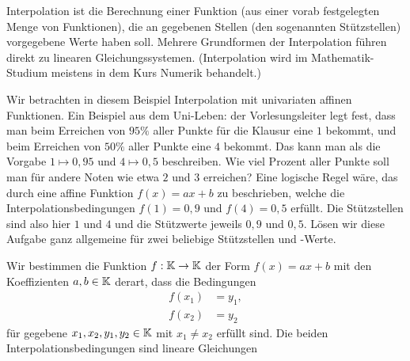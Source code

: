 \begin{bsp}
	Interpolation ist die Berechnung einer Funktion (aus einer vorab festgelegten Menge von Funktionen), die an gegebenen Stellen (den sogenannten Stützstellen) vorgegebene Werte haben soll. Mehrere Grundformen der Interpolation führen direkt zu linearen Gleichungssystemen. (Interpolation wird im Mathematik-Studium meistens in dem Kurs Numerik behandelt.) 
	
	Wir betrachten in diesem Beispiel Interpolation mit univariaten affinen Funktionen. Ein Beispiel aus dem Uni-Leben: der Vorlesungsleiter legt fest, dass man beim Erreichen von $95 \%$ aller Punkte für die Klausur eine $1$ bekommt, und beim Erreichen von $50 \%$ aller Punkte eine $4$ bekommt. Das kann man als die Vorgabe $1 \mapsto 0{,}95$ und $4 \mapsto 0{,}5$ beschreiben. Wie viel Prozent aller Punkte soll man für andere Noten wie etwa $2$ und $3$ erreichen? Eine logische Regel wäre, das durch eine affine Funktion $f(x) = a x+ b$ zu beschrieben, welche die Interpolationsbedingungen $f(1) = 0{,}9$ und $f(4) = 0{,}5$ erfüllt. Die Stützstellen sind also hier $1$ und $4$ und die Stützwerte jeweils $0{,}9$ und $0{,}5$. Lösen wir diese Aufgabe ganz allgemeine für zwei beliebige Stützstellen und -Werte. 
	
	Wir bestimmen die Funktion $ f : \mathbb K \to \mathbb K $ der Form $ f(x) = ax+b$ mit den Koeffizienten $ a,b \in \mathbb K $ derart, dass die Bedingungen
	\begin{align*}
		f(x_1) &= y_1, \\
		f(x_2) &= y_2
	\end{align*}
	für gegebene $ x_1,x_2,y_1,y_2 \in \mathbb K $  mit $ x_1 \neq x_2 $ erfüllt sind. Die beiden Interpolationsbedingungen sind lineare Gleichungen 


\end{bsp}
